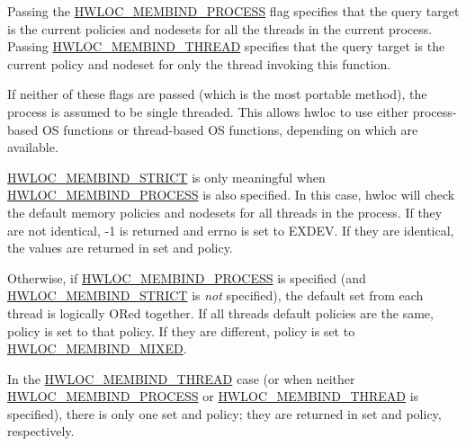 Passing the \hyperlink{a00191_ggab00475fd98815bf4fb9aaf752030e7d2a1b1b74aef138f64aff214a8cbdfe8eb4}{H\+W\+L\+O\+C\+\_\+\+M\+E\+M\+B\+I\+N\+D\+\_\+\+P\+R\+O\+C\+E\+SS} flag specifies that the query target is the current policies and nodesets for all the threads in the current process. Passing \hyperlink{a00191_ggab00475fd98815bf4fb9aaf752030e7d2a1dc7dd5cdcd5796893a325a524555298}{H\+W\+L\+O\+C\+\_\+\+M\+E\+M\+B\+I\+N\+D\+\_\+\+T\+H\+R\+E\+AD} specifies that the query target is the current policy and nodeset for only the thread invoking this function.

If neither of these flags are passed (which is the most portable method), the process is assumed to be single threaded. This allows hwloc to use either process-\/based OS functions or thread-\/based OS functions, depending on which are available.

\hyperlink{a00191_ggab00475fd98815bf4fb9aaf752030e7d2a0335311a0ee04166df2888d52b4a42c6}{H\+W\+L\+O\+C\+\_\+\+M\+E\+M\+B\+I\+N\+D\+\_\+\+S\+T\+R\+I\+CT} is only meaningful when \hyperlink{a00191_ggab00475fd98815bf4fb9aaf752030e7d2a1b1b74aef138f64aff214a8cbdfe8eb4}{H\+W\+L\+O\+C\+\_\+\+M\+E\+M\+B\+I\+N\+D\+\_\+\+P\+R\+O\+C\+E\+SS} is also specified. In this case, hwloc will check the default memory policies and nodesets for all threads in the process. If they are not identical, -\/1 is returned and errno is set to E\+X\+D\+EV. If they are identical, the values are returned in {\ttfamily set} and {\ttfamily policy}.

Otherwise, if \hyperlink{a00191_ggab00475fd98815bf4fb9aaf752030e7d2a1b1b74aef138f64aff214a8cbdfe8eb4}{H\+W\+L\+O\+C\+\_\+\+M\+E\+M\+B\+I\+N\+D\+\_\+\+P\+R\+O\+C\+E\+SS} is specified (and \hyperlink{a00191_ggab00475fd98815bf4fb9aaf752030e7d2a0335311a0ee04166df2888d52b4a42c6}{H\+W\+L\+O\+C\+\_\+\+M\+E\+M\+B\+I\+N\+D\+\_\+\+S\+T\+R\+I\+CT} is {\itshape not} specified), the default set from each thread is logically OR\textquotesingle{}ed together. If all threads\textquotesingle{} default policies are the same, {\ttfamily policy} is set to that policy. If they are different, {\ttfamily policy} is set to \hyperlink{a00191_ggac9764f79505775d06407b40f5e4661e8a3185bd869b67817fb2bd5164bf360402}{H\+W\+L\+O\+C\+\_\+\+M\+E\+M\+B\+I\+N\+D\+\_\+\+M\+I\+X\+ED}.

In the \hyperlink{a00191_ggab00475fd98815bf4fb9aaf752030e7d2a1dc7dd5cdcd5796893a325a524555298}{H\+W\+L\+O\+C\+\_\+\+M\+E\+M\+B\+I\+N\+D\+\_\+\+T\+H\+R\+E\+AD} case (or when neither \hyperlink{a00191_ggab00475fd98815bf4fb9aaf752030e7d2a1b1b74aef138f64aff214a8cbdfe8eb4}{H\+W\+L\+O\+C\+\_\+\+M\+E\+M\+B\+I\+N\+D\+\_\+\+P\+R\+O\+C\+E\+SS} or \hyperlink{a00191_ggab00475fd98815bf4fb9aaf752030e7d2a1dc7dd5cdcd5796893a325a524555298}{H\+W\+L\+O\+C\+\_\+\+M\+E\+M\+B\+I\+N\+D\+\_\+\+T\+H\+R\+E\+AD} is specified), there is only one set and policy; they are returned in {\ttfamily set} and {\ttfamily policy}, respectively.

